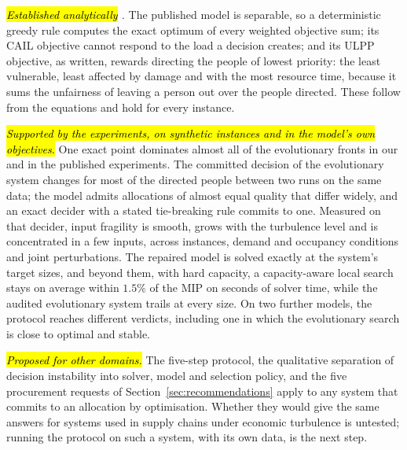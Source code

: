 \documentclass[systems,article,accept,moreauthors,pdftex]{Definitions/mdpi}
\begin{document}
\emph{\hl{Established analytically}%
.} The published model is separable, so a deterministic greedy rule
computes the exact optimum of every weighted objective sum; its CAIL objective cannot respond to
the load a decision creates; and its ULPP objective, as written, rewards directing the people of
lowest priority: the least vulnerable, least affected by damage and with the most resource time,
because it sums the unfairness of leaving a person out over the people directed. These follow from the equations and hold for every instance.

\emph{\hl{Supported by the experiments, on synthetic instances and in the model's own objectives.}%
} \linebreak  One
exact point dominates almost all of the evolutionary fronts in our and in the published
experiments. The committed decision of the evolutionary system changes for most of the directed
people between two runs on the same data; the model admits allocations of almost equal quality
that differ widely, and an exact decider with a stated tie-breaking rule commits to one. Measured
on that decider, input fragility is smooth, grows with the turbulence level and is concentrated in
a few inputs, across instances, demand and occupancy conditions and joint perturbations. The
repaired model is solved exactly at the system's target sizes, and beyond them, with hard
capacity, a capacity-aware local search stays on average within $1.5\%$ of the MIP on seconds of solver time,
while the audited evolutionary system trails at every size. On two
further models, the protocol reaches different verdicts, including one in which the evolutionary
search is close to optimal and stable.

\emph{\hl{Proposed for other domains.}%
} The five-step protocol, the qualitative separation of
decision instability into solver, model and selection policy, and the five procurement requests of
Section~\ref{sec:recommendations} apply to any system that commits to an allocation by
optimisation. Whether they would give the same answers for systems used in supply chains under
economic turbulence is untested; running the protocol on such a system, with its own data, is the
next step.

\vspace{6pt}
\end{document}
